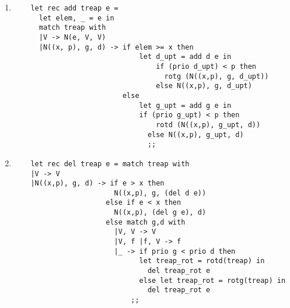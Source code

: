 \documentclass{article}
\begin{document}
\begin{enumerate}
\item \begin{verbatim}
    let rec add treap e = 
      let elem, _ = e in
      match treap with
      |V -> N(e, V, V)
      |N((x, p), g, d) -> if elem >= x then 
                              let d_upt = add d e in
                                  if (prio d_upt) < p then
                                    rotg (N((x,p), g, d_upt))
                                  else N((x,p), g, d_upt)
                          else 
                              let g_upt = add g e in
                              if (prio g_upt) < p then
                                  rotd (N((x,p), g_upt, d))
                                else N((x,p), g_upt, d)
                                ;;
\end{verbatim}

\item \begin{verbatim}
    let rec del treap e = match treap with
    |V -> V
    |N((x,p), g, d) -> if e > x then
                        N((x,p), g, (del d e))
                      else if e < x then
                        N((x,p), (del g e), d)
                      else match g,d with
                        |V, V -> V
                        |V, f |f, V -> f
                        |_ -> if prio g < prio d then
                              let treap_rot = rotd(treap) in
                                del treap_rot e
                              else let treap_rot = rotg(treap) in
                                del treap_rot e
                            ;;
\end{verbatim}
\end{enumerate}
\end{document}
